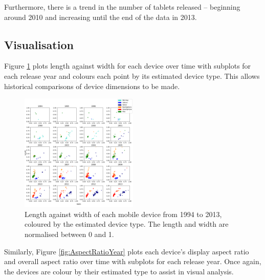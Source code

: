 \documentclass[conference]{IEEEtran}
\begin{document}
Furthermore, there is a trend in the number of tablets released -- beginning
around 2010 and increasing until the end of the data in 2013.


\subsection{Visualisation}

Figure \ref{fig:DimensionsYear} plots length against width for each device over
time with subplots for each release year and colours each point by its estimated
device type. This allows historical comparisons of device dimensions to be made.

\begin{figure}
    \centering
    \includegraphics[width=0.5\textwidth]{../Visualisations/B/length-width-ctype-syear.png}
    \caption{Length against width of each mobile device from 1994 to 2013,
	coloured by the estimated device type. The length and width are
	normalised between 0 and 1.}
    \label{fig:DimensionsYear}
\end{figure}

Similarly, Figure \ref{fig:AspectRatioYear} plots each device's display
aspect ratio and overall aspect ratio over time with subplots for each release
year.
Once again, the devices are colour by their estimated type to assist in visual analysis.
\end{document}
